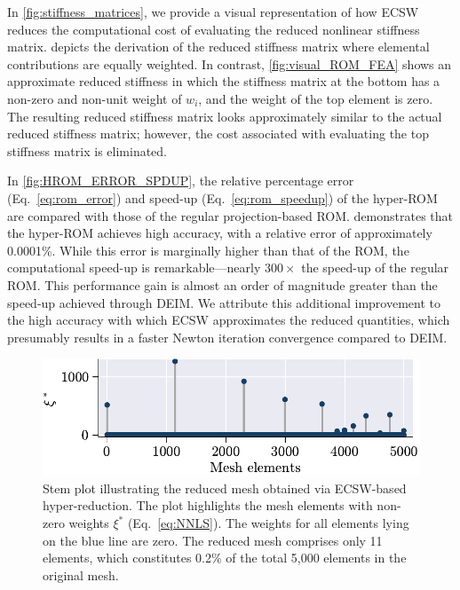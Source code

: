 \documentclass[11pt]{article}
\begin{document}
In \cref{fig:stiffness_matrices}, we provide a visual representation of how ECSW reduces the computational cost of evaluating the reduced nonlinear stiffness matrix.
 depicts the derivation of the reduced stiffness matrix where elemental contributions are equally weighted.
In contrast, \cref{fig:visual_ROM_FEA} shows an approximate reduced stiffness in which the stiffness matrix at the bottom has a non-zero and non-unit weight of $w_i$, and the weight of the top element is zero.
The resulting reduced stiffness matrix looks approximately similar to the actual reduced stiffness matrix; however, the cost associated with evaluating the top stiffness matrix is eliminated.



In \cref{fig:HROM_ERROR_SPDUP}, the relative percentage error (Eq.~\ref{eq:rom_error}) and speed-up (Eq.~\ref{eq:rom_speedup}) of the hyper-ROM are compared with those of the regular projection-based ROM.
 demonstrates that the hyper-ROM achieves high accuracy, with a relative error of approximately 0.0001\%.
While this error is marginally higher than that of the ROM, the computational speed-up is remarkable—nearly $300\times$ the speed-up of the regular ROM.
This performance gain is almost an order of magnitude greater than the speed-up achieved through DEIM.
We attribute this additional improvement to the high accuracy with which ECSW approximates the reduced quantities, which presumably results in a  faster Newton iteration convergence compared to DEIM.


\begin{figure}[t]
    \centering
    \includegraphics[width=0.8\linewidth]{reduced_mesh_ECSW_new.pdf}
    \caption{Stem plot illustrating the reduced mesh obtained via ECSW-based hyper-reduction. The plot highlights the mesh elements with non-zero weights $\xi^*$ (Eq.~\ref{eq:NNLS}). The weights for all elements lying on the blue line are zero. The reduced mesh comprises only 11 elements, which constitutes 0.2\% of the total 5,000 elements in the original mesh.}
    \label{fig:reduced_mesh_ecsw}
\end{figure}
\end{document}
